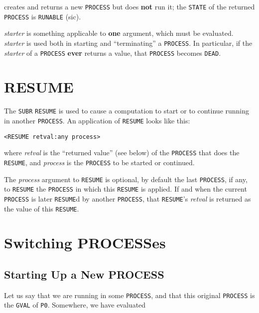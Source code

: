 \documentclass[a4paper]{scrbook}
\begin{document}
 creates and returns a new \texttt{PROCESS} but does \textbf{not} run it; the \texttt{STATE}
of the returned \texttt{PROCESS} is \texttt{RUNABLE} (sic).

\emph{starter} is something applicable to \textbf{one} argument, which must be evaluated. \emph{starter} is used both in
starting and ``terminating'' a \texttt{PROCESS}. In particular, if the \emph{starter} of a \texttt{PROCESS} \textbf{ever}
returns a value, that \texttt{PROCESS} becomes \texttt{DEAD}.

\section{RESUME}\label{resume}

 The \texttt{SUBR} \texttt{RESUME} is used to cause a computation to start or to continue
running in another \texttt{PROCESS}. An application of \texttt{RESUME} looks like this:

\begin{verbatim}
<RESUME retval:any process>
\end{verbatim}

where \emph{retval} is the ``returned value'' (see below) of the \texttt{PROCESS} that does the \texttt{RESUME}, and
\emph{process} is the \texttt{PROCESS} to be started or continued.

The \emph{process} argument to \texttt{RESUME} is optional, by default the last \texttt{PROCESS}, if any, to
\texttt{RESUME} the \texttt{PROCESS} in which this \texttt{RESUME} is applied. If and when the current \texttt{PROCESS} is
later \texttt{RESUME}d by another \texttt{PROCESS}, that \texttt{RESUME}'s \emph{retval} is returned as the value of this
\texttt{RESUME}.

\section{Switching PROCESSes}\label{switching-processes}

\subsection{Starting Up a New PROCESS}\label{starting-up-a-new-process}

Let us say that we are running in some \texttt{PROCESS}, and that this original \texttt{PROCESS} is the \texttt{GVAL} of
\texttt{P0}. Somewhere, we have evaluated
\end{document}
